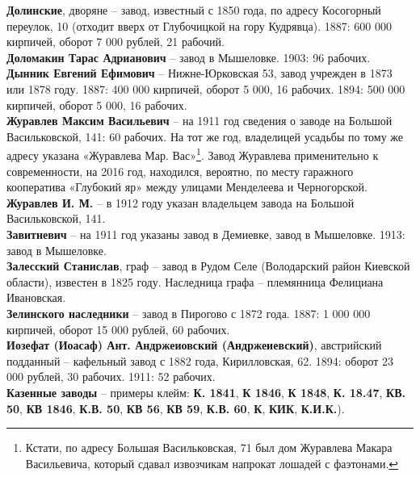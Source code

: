 \noindent\textbf{Долинские}, дворяне – завод, известный с 1850 года, по адресу Косогорный переулок, 10 (отходит вверх от Глубочицкой на гору Кудрявца). 1887: 600 000 кирпичей, оборот 7 000 рублей, 21 рабочий.\\

\noindent\textbf{Доломакин Тарас Адрианович} – завод в Мышеловке. 1903: 96 рабочих.\\

\noindent\textbf{Дынник Евгений Ефимович} – Нижне-Юрковская 53, завод учрежден в 1873 или 1878 году. 1887: 400 000 кирпичей, оборот 5 000, 16 рабочих. 1894: 500 000 кирпичей, оборот 5 000, 16 рабочих.\\

\noindent\textbf{Журавлев Максим Васильевич} – на 1911 год сведения о заводе на Большой Васильковской, 141: 60 рабочих. На тот же год, владелицей усадьбы по тому же адресу указана «Журавлева Мар. Вас»\footnote{Кстати, по адресу Большая Васильковская, 71 был дом Журавлева Макара Васильевича, который сдавал извозчикам напрокат лошадей с фаэтонами.}. Завод Журавлева применительно к современности, на 2016 год, находился, вероятно, по месту гаражного кооператива «Глубокий яр» между улицами Менделеева и Черногорской.\\

\noindent\textbf{Журавлев И. М.} – в 1912 году указан владельцем завода на Большой Васильковской, 141.\\

\noindent\textbf{Завитневич} – на 1911 год указаны завод в Демиевке, завод в Мышеловке. 1913: завод в Мышеловке.\\

\noindent\textbf{Залесский Станислав}, граф – завод в Рудом Селе (Володарский район Киевской области), известен в 1825 году. Наследница графа – племянница Фелициана Ивановская.\\

\noindent\textbf{Зелинского наследники} – завод в Пирогово с 1872 года. 1887: 1 000 000 кирпичей, оборот 15 000 рублей, 60 рабочих.\\

\noindent\textbf{Иозефат (Иоасаф) Ант. Андржеиовский (Андржеиевский)}, австрийский подданный – кафельный завод с 1882 года, Кирилловская, 62. 1894: оборот 23 000 рублей, 30 рабочих. 1911: 52 рабочих.\\

\noindent\textbf{Казенные заводы} – примеры клейм: \textbf{К. 1841}, \textbf{К 1846}, \textbf{К 1848}, \textbf{К. 18.47}, \textbf{КВ. 50}, \textbf{КВ 1846}, \textbf{К.В. 50}, \textbf{КВ 56}, \textbf{КВ 59}, \textbf{К.В. 60}, \textbf{К}, \textbf{КИК}, \textbf{К.И.К.}).

